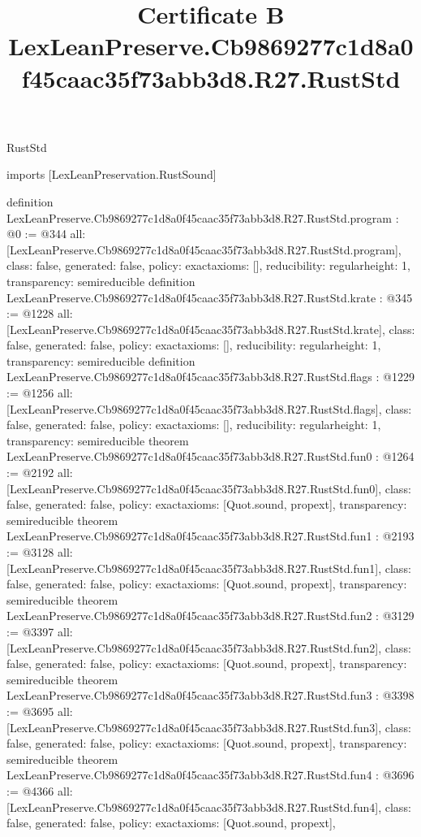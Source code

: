 \begin{lexlean}{RustStd}
\title{Certificate B LexLeanPreserve.Cb9869277c1d8a0f45caac35f73abb3d8.R27.RustStd}
\begin{coremodule}
imports [LexLeanPreservation.RustSound]

definition LexLeanPreserve.Cb9869277c1d8a0f45caac35f73abb3d8.R27.RustStd.program : @0 := @344 {
  all: [LexLeanPreserve.Cb9869277c1d8a0f45caac35f73abb3d8.R27.RustStd.program],
  class: false,
  generated: false,
  policy: exact{axioms: []},
  reducibility: regular{height: 1},
  transparency: semireducible
}
definition LexLeanPreserve.Cb9869277c1d8a0f45caac35f73abb3d8.R27.RustStd.krate : @345 := @1228 {
  all: [LexLeanPreserve.Cb9869277c1d8a0f45caac35f73abb3d8.R27.RustStd.krate],
  class: false,
  generated: false,
  policy: exact{axioms: []},
  reducibility: regular{height: 1},
  transparency: semireducible
}
definition LexLeanPreserve.Cb9869277c1d8a0f45caac35f73abb3d8.R27.RustStd.flags : @1229 := @1256 {
  all: [LexLeanPreserve.Cb9869277c1d8a0f45caac35f73abb3d8.R27.RustStd.flags],
  class: false,
  generated: false,
  policy: exact{axioms: []},
  reducibility: regular{height: 1},
  transparency: semireducible
}
theorem LexLeanPreserve.Cb9869277c1d8a0f45caac35f73abb3d8.R27.RustStd.fun0 : @1264 := @2192 {
  all: [LexLeanPreserve.Cb9869277c1d8a0f45caac35f73abb3d8.R27.RustStd.fun0],
  class: false,
  generated: false,
  policy: exact{axioms: [Quot.sound, propext]},
  transparency: semireducible
}
theorem LexLeanPreserve.Cb9869277c1d8a0f45caac35f73abb3d8.R27.RustStd.fun1 : @2193 := @3128 {
  all: [LexLeanPreserve.Cb9869277c1d8a0f45caac35f73abb3d8.R27.RustStd.fun1],
  class: false,
  generated: false,
  policy: exact{axioms: [Quot.sound, propext]},
  transparency: semireducible
}
theorem LexLeanPreserve.Cb9869277c1d8a0f45caac35f73abb3d8.R27.RustStd.fun2 : @3129 := @3397 {
  all: [LexLeanPreserve.Cb9869277c1d8a0f45caac35f73abb3d8.R27.RustStd.fun2],
  class: false,
  generated: false,
  policy: exact{axioms: [Quot.sound, propext]},
  transparency: semireducible
}
theorem LexLeanPreserve.Cb9869277c1d8a0f45caac35f73abb3d8.R27.RustStd.fun3 : @3398 := @3695 {
  all: [LexLeanPreserve.Cb9869277c1d8a0f45caac35f73abb3d8.R27.RustStd.fun3],
  class: false,
  generated: false,
  policy: exact{axioms: [Quot.sound, propext]},
  transparency: semireducible
}
theorem LexLeanPreserve.Cb9869277c1d8a0f45caac35f73abb3d8.R27.RustStd.fun4 : @3696 := @4366 {
  all: [LexLeanPreserve.Cb9869277c1d8a0f45caac35f73abb3d8.R27.RustStd.fun4],
  class: false,
  generated: false,
  policy: exact{axioms: [Quot.sound, propext]},
}
\end{coremodule}
\end{lexlean}
